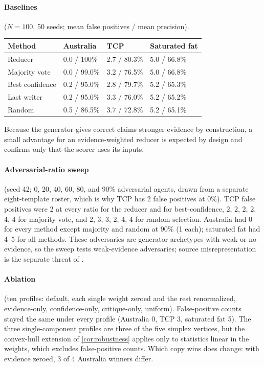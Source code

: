 \paragraph{Baselines} ($N = 100$, 50 seeds; mean false positives / mean precision).

\begin{center}
\small
\begin{tabular}{@{}llll@{}}
  \toprule
  Method & Australia & TCP & Saturated fat \\
  \midrule
  Reducer & 0.0 / 100\% & 2.7 / 80.3\% & 5.0 / 66.8\% \\
  Majority vote & 0.0 / 99.0\% & 3.2 / 76.5\% & 5.0 / 66.8\% \\
  Best confidence & 0.2 / 95.0\% & 2.8 / 79.7\% & 5.2 / 65.3\% \\
  Last writer & 0.2 / 95.0\% & 3.3 / 76.0\% & 5.2 / 65.2\% \\
  Random & 0.5 / 86.5\% & 3.7 / 72.8\% & 5.2 / 65.1\% \\
  \bottomrule
\end{tabular}
\end{center}

Because the generator gives correct claims stronger evidence by construction, a small advantage for an evidence-weighted reducer is expected by design and confirms only that the scorer uses its inputs.

\paragraph{Adversarial-ratio sweep} (seed 42; 0, 20, 40, 60, 80, and 90\% adversarial agents, drawn from a separate eight-template roster, which is why TCP has 2 false positives at 0\%). TCP false positives were 2 at every ratio for the reducer and for best-confidence, 2, 2, 2, 2, 4, 4 for majority vote, and 2, 3, 3, 2, 4, 4 for random selection. Australia had 0 for every method except majority and random at 90\% (1 each); saturated fat had 4--5 for all methods. These adversaries are generator archetypes with weak or no evidence, so the sweep tests weak-evidence adversaries; source misrepresentation is the separate threat of .

\paragraph{Ablation} (ten profiles: default, each single weight zeroed and the rest renormalized, evidence-only, confidence-only, critique-only, uniform). False-positive counts stayed the same under every profile (Australia 0, TCP 3, saturated fat 5). The three single-component profiles are three of the five simplex vertices, but the convex-hull extension of \cref{cor:robustness} applies only to statistics linear in the weights, which excludes false-positive counts. Which copy wins does change: with evidence zeroed, 3 of 4 Australia winners differ.
